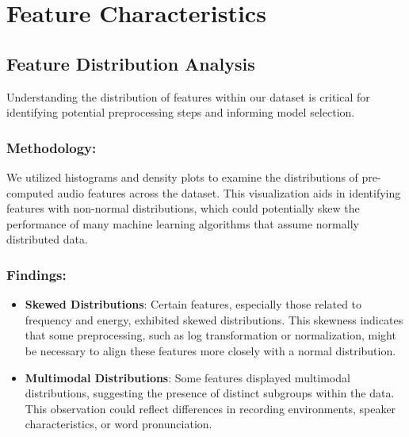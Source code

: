 \section{Feature Characteristics}

\subsection{Feature Distribution Analysis}

Understanding the distribution of features within our dataset is critical for identifying potential preprocessing steps and informing model selection.

\subsubsection{Methodology:}

We utilized histograms and density plots to examine the distributions of pre-computed audio features across the dataset. This visualization aids in identifying features with non-normal distributions, which could potentially skew the performance of many machine learning algorithms that assume normally distributed data.

\subsubsection{Findings:}

\begin{itemize}
    \item \textbf{Skewed Distributions}: Certain features, especially those related to frequency and energy, exhibited skewed distributions. This skewness indicates that some preprocessing, such as log transformation or normalization, might be necessary to align these features more closely with a normal distribution.
    \item \textbf{Multimodal Distributions}: Some features displayed multimodal distributions, suggesting the presence of distinct subgroups within the data. This observation could reflect differences in recording environments, speaker characteristics, or word pronunciation.
\end{itemize}

